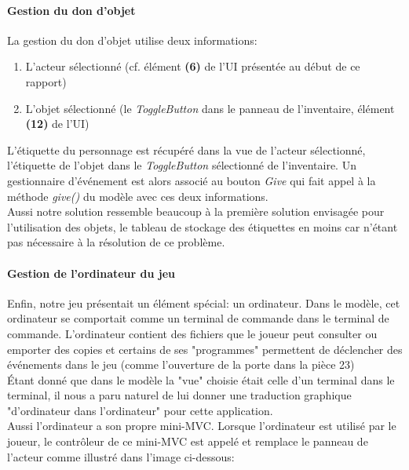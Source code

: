 \documentclass[./standalone.tex]{subfiles}
\begin{document}
\paragraph{Gestion du don d'objet\\}

La gestion du don d'objet utilise deux informations:
\begin{enumerate}
	\item L'acteur sélectionné (cf. élément \textbf{(6)} de l'UI présentée au début de ce rapport)
	\item L'objet sélectionné (le \textit{ToggleButton} dans le panneau de l'inventaire, élément \textbf{(12)} de l'UI)
\end{enumerate}

L'étiquette du personnage est récupéré dans la vue de l'acteur sélectionné, l'étiquette de l'objet dans le \textit{ToggleButton} sélectionné de l'inventaire. Un gestionnaire d'événement est alors associé au bouton \textit{Give} qui fait appel à la méthode \textit{give()} du modèle avec ces deux informations.\\

Aussi notre solution ressemble beaucoup à la première solution envisagée pour l'utilisation des objets, le tableau de stockage des étiquettes en moins car n'étant pas nécessaire à la résolution de ce problème.
\newpage

\paragraph{Gestion de l'ordinateur du jeu\\}
Enfin, notre jeu présentait un élément spécial: un ordinateur. Dans le modèle, cet ordinateur se comportait comme un terminal de commande dans le terminal de commande. L'ordinateur contient des fichiers que le joueur peut consulter ou emporter des copies et certains de ses "programmes" permettent de déclencher des événements dans le jeu (comme l'ouverture de la porte dans la pièce 23)\\

Étant donné que dans le modèle la "vue" choisie était celle d'un terminal dans le terminal, il nous a paru naturel de lui donner une traduction graphique "d'ordinateur dans l'ordinateur" pour cette application.\\

Aussi l'ordinateur a son propre mini-MVC. Lorsque l'ordinateur est utilisé par le joueur, le contrôleur de ce mini-MVC est appelé et remplace le panneau de l'acteur comme illustré dans l'image ci-dessous:
\end{document}
